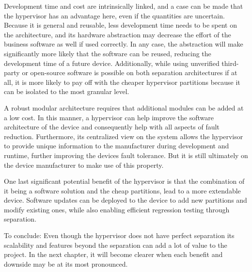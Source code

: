 Development time and cost are intrinsically linked, and a case can be made that the hypervisor has an advantage here, even if the quantities are uncertain. Because it is general and reusable, less development time needs to be spent on the architecture, and its hardware abstraction may decrease the effort of the business software as well if used correctly. In any case, the abstraction will make significantly more likely that the software can be reused, reducing the development time of a future device.
Additionally, while using unverified third-party or open-source software is possible on both separation architectures if at all, it is more likely to pay off with the cheaper hypervisor partitions because it can be isolated to the most granular level.

A robust modular architecture requires that additional modules can be added at a low cost. In this manner, a hypervisor can help improve the software architecture of the device and consequently help with all aspects of fault reduction. Furthermore, its centralized view on the system allows the hypervisor to provide unique information to the manufacturer during development and runtime, further improving the devices fault tolerance.
But it is still ultimately on the device manufacturer to make use of this property.

One last significant potential benefit of the hypervisor is that the combination of it being a software solution and the cheap partitions, lead to a more extendable device. Software updates can be deployed to the device to add new partitions and modify existing ones, while also enabling efficient regression testing through separation.

To conclude: Even though the hypervisor does not have perfect separation its scalability and features beyond the separation can add a lot of value to the project. In the next chapter, it will become clearer when each benefit and downside may be at its most pronounced.